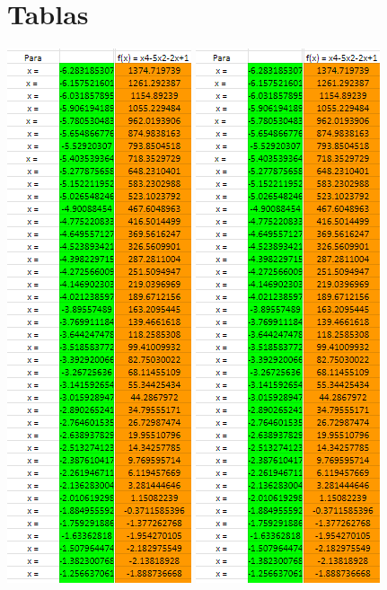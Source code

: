 \section{Tablas}

\begin{table}[H]
    \centering
    \includegraphics[width=2.13542in,height=6.19792in]{media/image23.png}
    \includegraphics[width=2.13542in,height=6.19792in]{media/image23.png}    

\end{table}
